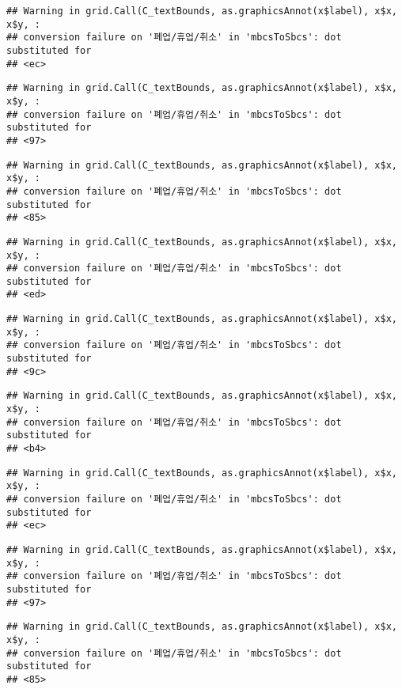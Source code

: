 \documentclass[
]{book}
\begin{document}
\begin{verbatim}
## Warning in grid.Call(C_textBounds, as.graphicsAnnot(x$label), x$x, x$y, :
## conversion failure on '폐업/휴업/취소' in 'mbcsToSbcs': dot substituted for
## <ec>
\end{verbatim}

\begin{verbatim}
## Warning in grid.Call(C_textBounds, as.graphicsAnnot(x$label), x$x, x$y, :
## conversion failure on '폐업/휴업/취소' in 'mbcsToSbcs': dot substituted for
## <97>
\end{verbatim}

\begin{verbatim}
## Warning in grid.Call(C_textBounds, as.graphicsAnnot(x$label), x$x, x$y, :
## conversion failure on '폐업/휴업/취소' in 'mbcsToSbcs': dot substituted for
## <85>
\end{verbatim}

\begin{verbatim}
## Warning in grid.Call(C_textBounds, as.graphicsAnnot(x$label), x$x, x$y, :
## conversion failure on '폐업/휴업/취소' in 'mbcsToSbcs': dot substituted for
## <ed>
\end{verbatim}

\begin{verbatim}
## Warning in grid.Call(C_textBounds, as.graphicsAnnot(x$label), x$x, x$y, :
## conversion failure on '폐업/휴업/취소' in 'mbcsToSbcs': dot substituted for
## <9c>
\end{verbatim}

\begin{verbatim}
## Warning in grid.Call(C_textBounds, as.graphicsAnnot(x$label), x$x, x$y, :
## conversion failure on '폐업/휴업/취소' in 'mbcsToSbcs': dot substituted for
## <b4>
\end{verbatim}

\begin{verbatim}
## Warning in grid.Call(C_textBounds, as.graphicsAnnot(x$label), x$x, x$y, :
## conversion failure on '폐업/휴업/취소' in 'mbcsToSbcs': dot substituted for
## <ec>
\end{verbatim}

\begin{verbatim}
## Warning in grid.Call(C_textBounds, as.graphicsAnnot(x$label), x$x, x$y, :
## conversion failure on '폐업/휴업/취소' in 'mbcsToSbcs': dot substituted for
## <97>
\end{verbatim}

\begin{verbatim}
## Warning in grid.Call(C_textBounds, as.graphicsAnnot(x$label), x$x, x$y, :
## conversion failure on '폐업/휴업/취소' in 'mbcsToSbcs': dot substituted for
## <85>
\end{verbatim}
\end{document}
